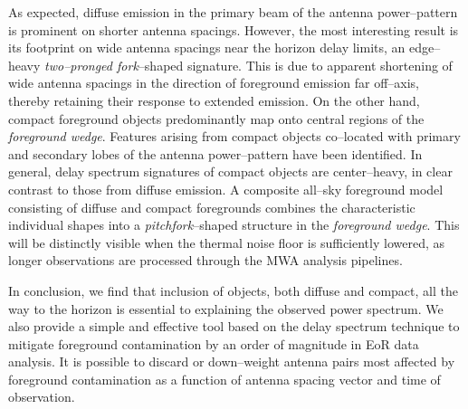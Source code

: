 \documentclass[preprint2,iop,numberedappendix]{emulateapj}
\begin{document}
As expected, diffuse emission in the primary beam of the antenna power--pattern is prominent on shorter antenna spacings. However, the most interesting result is its footprint on wide antenna spacings near the horizon delay limits, an edge--heavy {\it two--pronged fork}--shaped signature. This is due to apparent shortening of wide antenna spacings in the direction of foreground emission far off--axis, thereby retaining their response to extended emission. On the other hand, compact foreground objects predominantly map onto central regions of the {\it foreground wedge}. Features arising from compact objects co--located with primary and secondary lobes of the antenna power--pattern have been identified. In general, delay spectrum signatures of compact objects are center--heavy, in clear contrast to those from diffuse emission. A composite all--sky foreground model consisting of diffuse and compact foregrounds combines the characteristic individual shapes into a {\it pitchfork}--shaped structure in the {\it foreground wedge}. This will be distinctly visible when the thermal noise floor is sufficiently lowered, as longer observations are processed through the MWA analysis pipelines.

In conclusion, we find that inclusion of objects, both diffuse and compact, all the way to the horizon is essential to explaining the observed power spectrum. We also provide a simple and effective tool based on the delay spectrum technique to mitigate foreground contamination by an order of magnitude in EoR data analysis. It is possible to discard or down--weight antenna pairs most affected by foreground contamination as a function of antenna spacing vector and time of observation.

\acknowledgments
\end{document}

